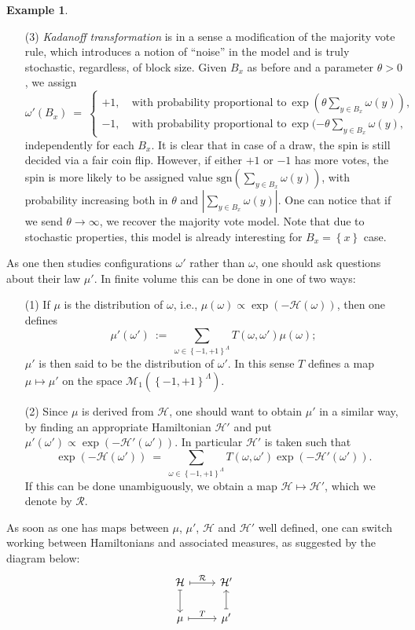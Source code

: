 \documentclass[12pt]{article}
\renewcommand{\H}{\mathcal{H}}
\newcommand{\M}{\mathcal{M}}
\newcommand{\RR}{\mathcal{R}}
\newcommand{\set}[1]{\left\{#1\right\}}
\newcommand{\ra}{\rightarrow}
\newcommand{\1}{\mathbbm{1}}
\newcommand{\5}{\vspace{0.5cm}}
\theoremstyle{definition}
\newtheorem{ex}[thm]{Example}
\begin{document}
\begin{ex}
\begin{itemize}
	\item[(3)] \textit{Kadanoff transformation} is in a sense a modification of the majority vote rule, which introduces a notion of ``noise'' in the model and is truly stochastic, regardless, of block size. Given $B_x$ as before and a parameter $\theta>0$, we assign
	$$\omega'(B_x) ~=~ \begin{cases}
	+1, ~&\text{with probability proportional to}~\exp(\theta\sum_{y\in B_x}\omega(y)), \\
	-1, ~&\text{with probability proportional to}~\exp(-\theta\sum_{y\in B_x}\omega(y),
	\end{cases}$$
	independently for each $B_x$. It is clear that in case of a draw, the spin is still decided via a fair coin flip. However, if either $+1$ or $-1$ has more votes, the spin is more likely to be assigned value $\mathrm{sgn}(\sum_{y\in B_x}\omega(y))$, with probability increasing both in $\theta$ and $|\sum_{y\in B_x}\omega(y)|$. One can notice that if we send $\theta\ra\infty$, we recover the majority vote model. Note that due to stochastic properties, this model is already interesting for $B_x=\set{x}$ case.
\end{itemize}
\end{ex}

As one then studies configurations $\omega'$ rather than $\omega$, one should ask questions about their law $\mu'$. In finite volume this can be done in one of two ways:
\begin{itemize}
	\item[(1)] If $\mu$ is the distribution of $\omega$, i.e., $\mu(\omega)\propto\exp(-\H(\omega))$, then one defines
	$$\mu'(\omega') ~:=~ \sum_{\omega\in\set{-1,+1}^\Lambda}T(\omega,\omega')\mu(\omega);$$
	$\mu'$ is then said to be the distribution of $\omega'$. In this sense $T$ defines a map $\mu\mapsto\mu'$ on the space $\M_1(\set{-1,+1}^\Lambda)$.
	\item[(2)] Since $\mu$ is derived from $\H$, one should want to obtain $\mu'$ in a similar way, by finding an appropriate Hamiltonian $\H'$ and put $\mu'(\omega')\propto\exp(-\H'(\omega'))$. In particular $\H'$ is taken such that
	$$\exp(-\H(\omega')) ~=~ \sum_{\omega\in\set{-1,+1}^{\Lambda}}T(\omega,\omega')\exp(-\H'(\omega')).$$
	If this can be done unambiguously, we obtain a map $\H\mapsto\H'$, which we denote by $\RR$.
\end{itemize}

As soon as one has maps between $\mu$, $\mu'$, $\H$ and $\H'$ well defined, one can switch working between Hamiltonians and associated measures, as suggested by the diagram below:
\begin{equation}\label{RGdiagram}
\begin{tikzcd}
    \H \arrow[r, mapsto, "\RR"] \arrow[d, mapsto] & \H' \\
    \mu \arrow[r, mapsto, "T"] & \mu' \arrow[u, mapsto]
\end{tikzcd}
\end{equation}
\end{document}
